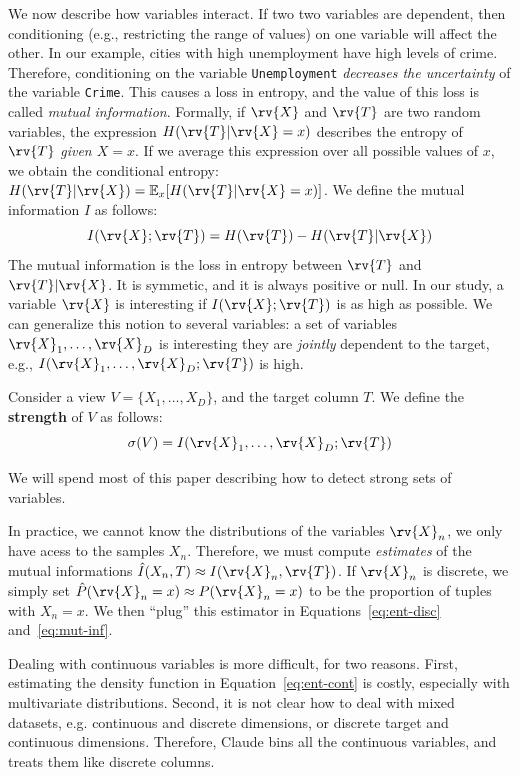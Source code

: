 We now describe how variables interact. If two two variables are dependent,
then conditioning (e.g., restricting the range of values) on one variable will
affect the other. In our example, cities with high unemployment have high
levels of crime.  Therefore, conditioning on the variable \texttt{Unemployment}
\emph{decreases the uncertainty} of the variable \texttt{Crime}. This causes a
loss in entropy, and the value of this loss is called \emph{mutual
information}.  Formally, if $\rv{X}$ and $\rv{T}$ are two random variables, the
expression $H(\rv{T} | \rv{X} = x)$ describes the entropy of $\rv{T}$
\emph{given $X = x$}. If we average this expression over all possible values of
$x$, we obtain the conditional entropy: $H(\rv{T}|\rv{X}) = \mathbb{E}_{x}
[H(\rv{T} | \rv{X} = x)]$. We define the mutual information $I$ as follows:
\begin{equation}\label{eq:mut-inf}
    I(\rv{X}; \rv{T}) = H(\rv{T}) - H(\rv{T} | \rv{X})
\end{equation}
The mutual information is the loss in entropy between $\rv{T}$ and
$\rv{T} | \rv{X}$. It is symmetic, and it is always positive or null. In our
study, a variable $\rv{X}$ is interesting if $I(\rv{X}; \rv{T})$ is as high as
possible.  We can generalize this notion to several variables: a set of
variables $\rv{X}_1, \ldots, \rv{X}_D$ is interesting they are \emph{jointly}
dependent to the target, e.g., $I(\rv{X}_1, \ldots, \rv{X}_D ; \rv{T})$ is
high.
\begin{definition}
Consider a view $V = \{X_1, \ldots, X_D\}$, and the target column $T$. We
define the \textbf{strength} of $V$ as follows: 
\begin{equation}\label{eq:strength}
    \sigma(V) = I(\rv{X}_1, \ldots, \rv{X}_D ; \rv{T})
\end{equation}
\end{definition} 
We will spend most of this paper describing how to detect strong sets of variables.

In practice, we cannot know the distributions of the variables $\rv{X}_n$, we
only have acess to the samples $X_n$. Therefore, we must compute \emph{estimates}
of the mutual informations $\hat{I}(X_n, T) \approx I(\rv{X}_n, \rv{T})$.  If
$\rv{X}_n$ is discrete, we simply set $\hat{P}(\rv{X}_n = x) \approx P(\rv{X}_n =
x)$ to be the proportion of tuples with $X_n=x$. We then ``plug'' this
estimator in Equations~\ref{eq:ent-disc} and~\ref{eq:mut-inf}.

Dealing with continuous variables is more difficult, for two reasons. First,
estimating the density function in Equation~\ref{eq:ent-cont} is costly,
especially with multivariate distributions.  Second, it is not clear how to
deal with mixed datasets, e.g. continuous and discrete dimensions, or discrete
target and continuous dimensions.  Therefore, Claude bins all the continuous
variables, and treats them like discrete columns.

